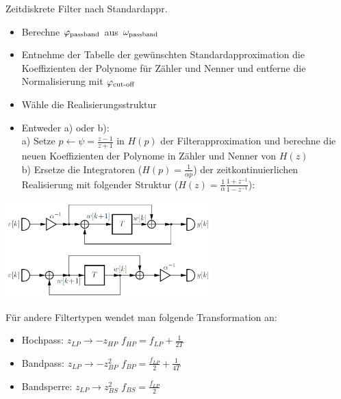 \documentclass[a4paper,landscape,6pt]{article}
\begin{document}
\begin{multicols}{3}
\begin{cookbox}{Zeitdiskrete Filter nach Standardappr. }
	\begin{itemize}
		\item[1)] Berechne $\varphi_{\textmd{passband}}$ aus $\omega_{\textmd{passband}}$
		\item[2)] Entnehme der Tabelle der gewünschten Standardapproximation die Koeffizienten der Polynome für Zähler und Nenner und entferne die Normalisierung mit $\varphi_{\textmd{cut-off}}$
		\item[3)] Wähle die Realisierungsstruktur
		\item[4)] Entweder a) oder b):\\
		a) Setze $p \leftarrow \psi = \frac{z-1}{z+1}$ in $H(p)$ der Filterapproximation und berechne die neuen Koeffizienten der Polynome in Zähler und Nenner von $H(z)$\\
		b) Ersetze die Integratoren ($H(p) = \frac{1}{\alpha p}$) der zeitkontinuierlichen Realisierung mit folgender Struktur ($H(z) = \frac{1}{\alpha}\frac{1+z^{-1}}{1-z^{-1}}$):
	\end{itemize}
\end{cookbox}
\begin{minipage}[t]{0.5\textwidth}
	\includegraphics[width=0.6\textwidth]{images_ssp/Zeitdisk_Int}\\
\end{minipage}
Für andere Filtertypen wendet man folgende Transformation an:
\begin{itemize}
	\item Hochpass: $z_{LP} \rightarrow -z_{HP}$ %
		\subitem $f_{HP} = f_{LP} + \frac{1}{2T}$
	\item Bandpass: $z_{LP}\rightarrow -z_{BP}^2$
		\subitem $f_{BP} = \frac{f_{LP}}{2} + \frac{1}{4T}$
	\item Bandsperre: $z_{LP} \rightarrow z_{BS}^2$
		\subitem $f_{BS} =  \frac{f_{LP}}{2}$
\end{itemize}


\end{multicols}
\end{document}
